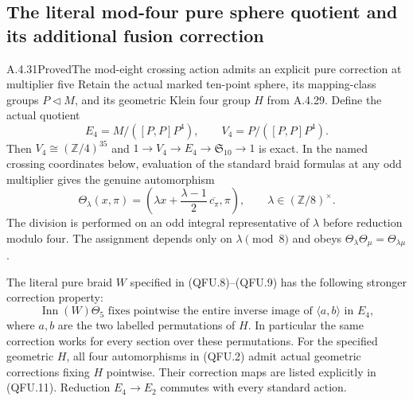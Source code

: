 \subsection{The literal mod-four pure sphere quotient and its additional fusion correction}

\begin{result}{A.4.31}{Proved}{The mod-eight crossing action admits an explicit pure correction at multiplier five}
\label{thm:sphere10-quaternary-fusion}
Retain the actual marked ten-point sphere, its mapping-class
groups $P\triangleleft M$, and its geometric Klein four group
$H$ from A.4.29.  Define the actual quotient
\[
 E_4=M/([P,P]P^4),\qquad V_4=P/([P,P]P^4).
                                                               \tag{QFU.1}
\]
Then $V_4\cong(\mathbb Z/4)^{35}$ and
$1\to V_4\to E_4\to\mathfrak S_{10}\to1$ is exact.
In the named crossing coordinates below, evaluation of the
standard braid formulas at any odd multiplier gives the genuine
automorphism
\[
 \Theta_\lambda(x,\pi)
   =\left(\lambda x+\frac{\lambda-1}{2}\,
                  \overline{c_\pi},\pi\right),
       \qquad \lambda\in(\mathbb Z/8)^\times.
                                                               \tag{QFU.2}
\]
The division is performed on an odd integral representative of
$\lambda$ before reduction modulo four.  The assignment depends
only on $\lambda\pmod8$ and obeys
$\Theta_\lambda\Theta_\mu=\Theta_{\lambda\mu}$.

The literal pure braid $W$ specified in (QFU.8)--(QFU.9)
has the following stronger correction property:
\[
     \operatorname{Inn}(W)\Theta_5
       \text{ fixes pointwise the entire inverse image of }
          \langle a,b\rangle\text{ in }E_4,
                                                               \tag{QFU.3}
\]
where $a,b$ are the two labelled permutations of $H$.
In particular the same correction works for every section
over these permutations.  For the specified geometric $H$,
all four automorphisms in (QFU.2) admit actual geometric
corrections fixing $H$ pointwise.  Their correction maps are
listed explicitly in (QFU.11).  Reduction $E_4\to E_2$
commutes with every standard action.
\end{result}

